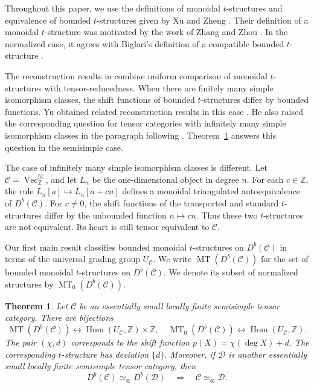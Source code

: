 \documentclass[11pt]{amsart}
\newcommand{\C}{\mathcal C}
\newcommand{\D}{\mathcal D}
\newcommand{\MT}{\operatorname{MT}}
\newcommand{\Vect}{\operatorname{Vec}}
\DeclareMathOperator{\Hom}{Hom}
\theoremstyle{definition}
\theoremstyle{remark}
\theoremstyle{plain}
\newtheorem{theoremA}{Theorem}
\begin{document}
Throughout this paper, we use the definitions of monoidal $t$-structures and equivalence of bounded $t$-structures given by Xu and Zheng \cite[Definitions~2.6 and 2.10]{XuZheng}. Their definition of a monoidal $t$-structure was motivated by the work of Zhang and Zhou \cite{ZhangZhou}. In the normalized case, it agrees with Biglari's definition of a compatible bounded $t$-structure \cite{Biglari}.

The reconstruction results in \cite{XuZheng} combine uniform comparison of monoidal $t$-structures with tensor-reducedness. When there are finitely many simple isomorphism classes, the shift functions of bounded $t$-structures differ by bounded functions. Yu obtained related reconstruction results in this case \cite[Theorem~4.5 and Corollary~4.7]{Yu}. He also raised the corresponding question for tensor categories with infinitely many simple isomorphism classes in the paragraph following \cite[Corollary~4.7]{Yu}. Theorem~\ref{theoremA} answers this question in the semisimple case.

The case of infinitely many simple isomorphism classes is different. Let $\C=\Vect_{\mathbb Z}^{\mathrm{fd}}$, and let $L_n$ be the one-dimensional object in degree $n$. For each $c\in\mathbb Z$, the rule $L_n[a]\mapsto L_n[a+cn]$ defines a monoidal triangulated autoequivalence of $D^b(\C)$. For $c\ne0$, the shift functions of the transported and standard $t$-structures differ by the unbounded function $n\mapsto cn$. Thus these two $t$-structures are not equivalent. Its heart is still tensor equivalent to $\C$.

Our first main result classifies bounded monoidal $t$-structures on $D^b(\C)$ in terms of the universal grading group $U_{\C}$. We write $\MT(D^b(\C))$ for the set of bounded monoidal $t$-structures on $D^b(\C)$. We denote its subset of normalized structures by $\MT_0(D^b(\C))$.


\begin{theoremA}\label{theoremA}
Let $\C$ be an essentially small locally finite semisimple tensor category. There are bijections 
\begin{equation*}
    \MT(D^b(\C)) \longleftrightarrow \Hom(U_{\C},\mathbb Z)\times\mathbb Z, \quad \MT_0(D^b(\C)) \longleftrightarrow \Hom(U_{\C},\mathbb Z).
\end{equation*}
The pair $(\chi,d)$ corresponds to the shift function $p(X)=\chi(\deg X)+d$. The corresponding $t$-structure has deviation $\{d\}$. Moreover, if $\D$ is another essentially small locally finite semisimple tensor category, then
\[
D^b(\C)\simeq_\otimes D^b(\D)\quad\Longrightarrow\quad\C\simeq_\otimes\D.
\]
\end{theoremA}
\end{document}
